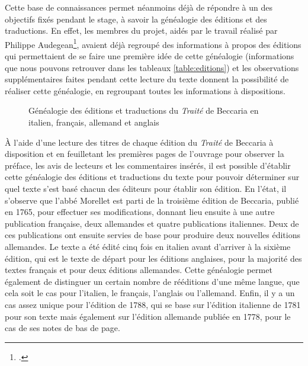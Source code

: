 Cette base de connaissances permet néanmoins déjà de répondre à un des objectifs fixés pendant le stage, à savoir la généalogie des éditions et des traductions. En effet, les membres du projet, aidés par le travail réalisé par Philippe Audegean\footcite[p.~33-117]{beccaria_audegean_2009}, avaient déjà regroupé des informations à propos des éditions qui permettaient de se faire une première idée de cette généalogie (informations que nous pouvons retrouver dans les tableaux \ref{table:editions}) et les observations supplémentaires faites pendant cette lecture du texte donnent la possibilité de réaliser cette généalogie, en regroupant toutes les informations à dispositions.
\begin{figure}[H]
    \centering
    \caption{Généalogie des éditions et traductions du \emph{Traité} de Beccaria en italien, français, allemand et anglais}
    \label{fig:genealogie}
\end{figure}
À l'aide d'une lecture des titres de chaque édition du \emph{Traité} de Beccaria à disposition et en feuilletant les premières pages de l'ouvrage pour observer la préface, les avis de lecteurs et les commentaires insérés, il est possible d'établir cette généalogie des éditions et traductions du texte pour pouvoir déterminer sur quel texte s'est basé chacun des éditeurs pour établir son édition. En l'état, il s'observe que l'abbé Morellet est parti de la troisième édition de Beccaria, publié en 1765, pour effectuer ses modifications, donnant lieu ensuite à une autre publication française, deux allemandes et quatre publications italiennes. Deux de ces publications ont ensuite servies de base pour produire deux nouvelles éditions allemandes. Le texte a été édité cinq fois en italien avant d'arriver à la sixième édition, qui est le texte de départ pour les éditions anglaises, pour la majorité des textes français et pour deux éditions allemandes. Cette généalogie permet également de distinguer un certain nombre de rééditions d'une même langue, que cela soit le cas pour l'italien, le français, l'anglais ou l'allemand. Enfin, il y a un cas assez unique pour l'édition de  1788, qui se base sur l'édition italienne de 1781 pour son texte mais également sur l'édition allemande publiée en 1778, pour le cas de ses notes de bas de page.

